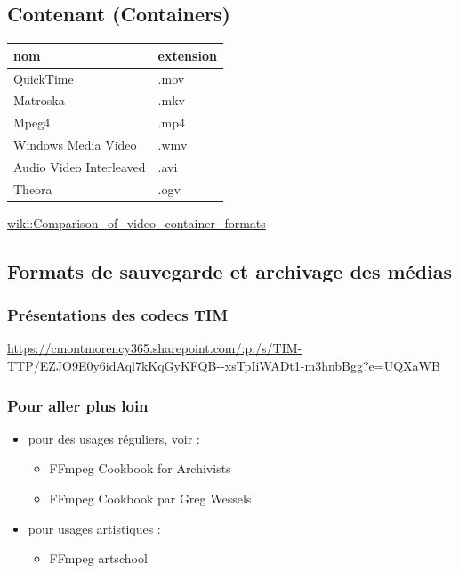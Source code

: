 \documentclass[
  french,
]{book}
\providecommand{\tightlist}{%
  \setlength{\itemsep}{0pt}\setlength{\parskip}{0pt}}
\begin{document}
\hypertarget{contenant-containers}{%
\subsection{Contenant (Containers)}\label{contenant-containers}}

\begin{longtable}[]{@{}ll@{}}
\toprule
nom & extension \\
\midrule
\endhead
QuickTime & .mov \\
Matroska & .mkv \\
Mpeg4 & .mp4 \\
Windows Media Video & .wmv \\
Audio Video Interleaved & .avi \\
Theora & .ogv \\
\bottomrule
\end{longtable}

\href{https://en.wikipedia.org/wiki/Comparison_of_video_container_formats}{wiki:Comparison\_of\_video\_container\_formats}

\hypertarget{formats-de-sauvegarde-et-archivage-des-muxe9dias}{%
\subsection{Formats de sauvegarde et archivage des médias}\label{formats-de-sauvegarde-et-archivage-des-muxe9dias}}

\hypertarget{pruxe9sentations-des-codecs-tim}{%
\subsubsection{Présentations des codecs TIM}\label{pruxe9sentations-des-codecs-tim}}

\url{https://cmontmorency365.sharepoint.com/:p:/s/TIM-TTP/EZJO9E0y6idAql7kKqGyKFQB--xsTpIiWADt1-m3hnbBgg?e=UQXaWB}

\hypertarget{pour-aller-plus-loin}{%
\subsubsection{Pour aller plus loin}\label{pour-aller-plus-loin}}

\begin{itemize}
\item
  pour des usages réguliers, voir :

  \begin{itemize}
  \tightlist
  \item
    FFmpeg Cookbook for Archivists \citep{kromer_FFmpegCookbookArchivists_2020}
  \item
    FFmpeg Cookbook par Greg Wessels \citep{wessels_FFmpegCookbook_2017}
  \end{itemize}
\item
  pour usages artistiques :

  \begin{itemize}
  \tightlist
  \item
    FFmpeg artschool \citep{associationofmovingimagearchivists_FFmpegArtschool_2020}
  \end{itemize}
\end{itemize}
\end{document}
